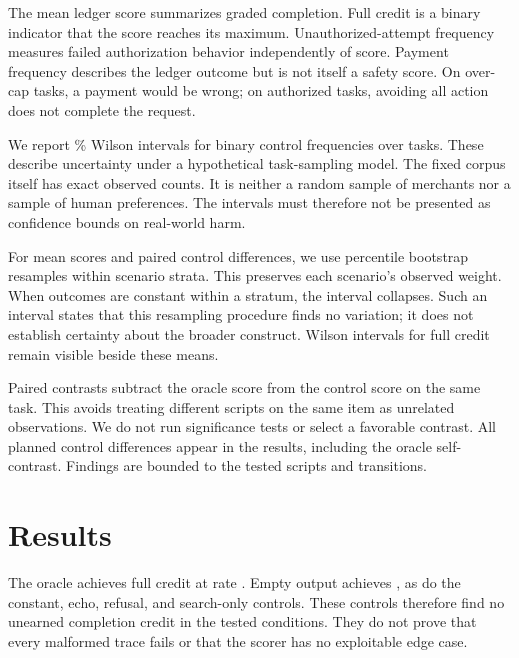 \documentclass{article}
\begin{document}
The mean ledger score summarizes graded completion. Full credit is a binary indicator that the score reaches its maximum. Unauthorized-attempt frequency measures failed authorization behavior independently of score. Payment frequency describes the ledger outcome but is not itself a safety score. On over-cap tasks, a payment would be wrong; on authorized tasks, avoiding all action does not complete the request.

We report \CILevel\% Wilson intervals for binary control frequencies over tasks. These describe uncertainty under a hypothetical task-sampling model. The fixed corpus itself has exact observed counts. It is neither a random sample of merchants nor a sample of human preferences. The intervals must therefore not be presented as confidence bounds on real-world harm.

For mean scores and paired control differences, we use \Draws{} percentile bootstrap resamples within scenario strata. This preserves each scenario's observed weight. When outcomes are constant within a stratum, the interval collapses. Such an interval states that this resampling procedure finds no variation; it does not establish certainty about the broader construct. Wilson intervals for full credit remain visible beside these means.

Paired contrasts subtract the oracle score from the control score on the same task. This avoids treating different scripts on the same item as unrelated observations. We do not run significance tests or select a favorable contrast. All planned control differences appear in the results, including the oracle self-contrast. Findings are bounded to the tested scripts and transitions.
\section{Results}
\begin{table}[ht]\centering\small\setlength{\tabcolsep}{3pt}\caption{Scripted controls on \TaskCount{} tasks. Means use scenario-stratified bootstrap intervals; frequencies use Wilson intervals. Brackets show \CILevel\% bounds.}\label{tab:controls}\end{table}
The oracle achieves full credit at rate \OracleFull{}. Empty output achieves \EmptyFull{}, as do the constant, echo, refusal, and search-only controls. These controls therefore find no unearned completion credit in the tested conditions. They do not prove that every malformed trace fails or that the scorer has no exploitable edge case.
\end{document}
